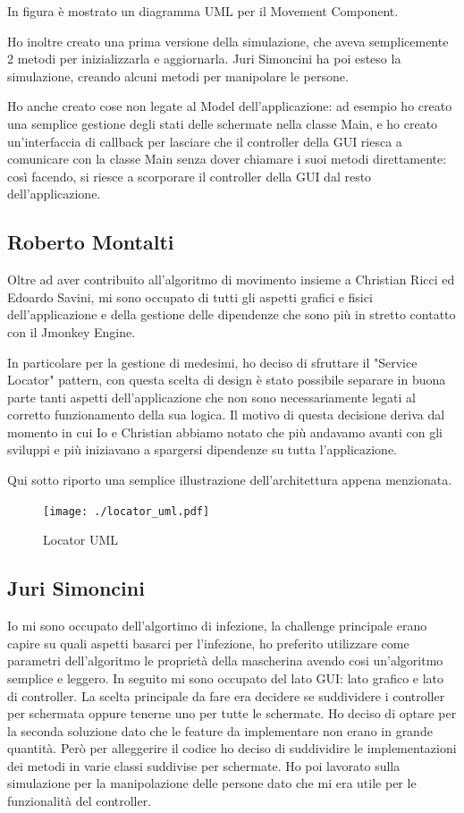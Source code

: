 In figura è mostrato un diagramma UML per il Movement Component.

Ho inoltre creato una prima versione della simulazione, che aveva semplicemente 2 metodi per inizializzarla e aggiornarla. Juri Simoncini ha poi esteso la simulazione, creando alcuni metodi per manipolare le persone.

Ho anche creato cose non legate al Model dell'applicazione: ad esempio ho creato una semplice gestione degli stati delle schermate nella classe Main, e ho creato un'interfaccia di callback per lasciare che il controller della GUI riesca a comunicare con la classe Main senza dover chiamare i suoi metodi direttamente: così facendo, si riesce a scorporare il controller della GUI dal resto dell'applicazione.

\subsection{Roberto Montalti}

Oltre ad aver contribuito all'algoritmo di movimento insieme a Christian Ricci ed Edoardo Savini, mi sono occupato di tutti gli aspetti grafici e fisici dell'applicazione e della gestione delle dipendenze che sono più in stretto contatto con il Jmonkey Engine.

In particolare per la gestione di medesimi, ho deciso di sfruttare il "Service Locator" pattern, con questa scelta di design è stato possibile separare in buona parte tanti aspetti dell'applicazione che non sono necessariamente legati al corretto funzionamento della sua logica.
Il motivo di questa decisione deriva dal momento in cui Io e Christian abbiamo notato che più andavamo avanti con gli sviluppi e più iniziavano a spargersi dipendenze su tutta l'applicazione.

Qui sotto riporto una semplice illustrazione dell'architettura appena menzionata.

\begin{figure}[h]
\centering{}
\texttt{[image: ./locator\_uml.pdf]}
\caption{Locator UML}
\label{img:Locator UML}
\end{figure}

\subsection{Juri Simoncini}
Io mi sono occupato dell'algortimo di infezione, la challenge principale erano capire su quali aspetti basarci per l'infezione, 
ho preferito utilizzare come parametri dell'algoritmo le proprietà della mascherina avendo cosi un'algoritmo semplice e leggero.
In seguito mi sono occupato del lato GUI: lato grafico e lato di controller.
La scelta principale da fare era decidere se suddividere i controller per schermata oppure tenerne uno per tutte le schermate.
Ho deciso di optare per la seconda soluzione dato che le feature da implementare non erano in grande quantità.
Però per alleggerire il codice ho deciso di suddividire le implementazioni dei metodi in varie classi suddivise per schermate.
Ho poi lavorato sulla simulazione per la manipolazione delle persone dato che mi era utile per le funzionalità del controller.


